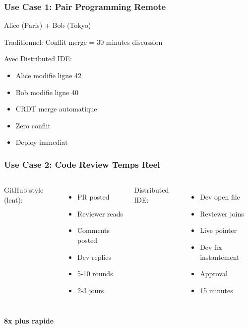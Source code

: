 \documentclass[aspectratio=16:9]{beamer}
\begin{document}

\begin{frame}
  \frametitle{Use Case 1: Pair Programming Remote}
  
  Alice (Paris) + Bob (Tokyo)
  
  \bigskip
  
  Traditionnel: Conflit merge = 30 minutes discussion
  
  \bigskip
  
  Avec Distributed IDE:
  \begin{itemize}
    \item Alice modifie ligne 42
    \item Bob modifie ligne 40
    \item CRDT merge automatique
    \item Zero conflit
    \item Deploy immediat
  \end{itemize}
\end{frame}

\begin{frame}
  \frametitle{Use Case 2: Code Review Temps Reel}
  
  \begin{columns}[T]
    GitHub style (lent):
    \begin{itemize}
      \item PR posted
      \item Reviewer reads
      \item Comments posted
      \item Dev replies
      \item 5-10 rounds
      \item 2-3 jours
    \end{itemize}
    
    Distributed IDE:
    \begin{itemize}
      \item Dev open file
      \item Reviewer joins
      \item Live pointer
      \item Dev fix instantement
      \item Approval
      \item 15 minutes
    \end{itemize}
  \end{columns}
  
  \bigskip
  
  \centering
  \textbf{8x plus rapide}
\end{frame}
\end{document}
